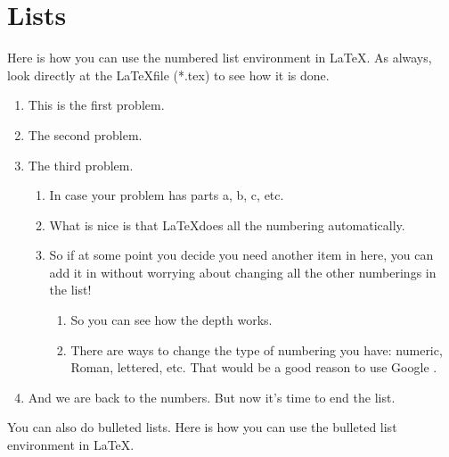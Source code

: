 \documentclass[12pt]{article}
\theoremstyle{definition}
\begin{document}
\section{Lists}
Here is how you can use the numbered list environment in \LaTeX.  As always, look directly at the \LaTeX \thinspace file (*.tex) to see how it is done.
\begin{enumerate} %

\item This is the first problem.
	
\item The second problem.
	
\item The third problem.
	
	\begin{enumerate}
		\item In case your problem has parts a, b, c, etc.
		
		\item What is nice is that \LaTeX \thinspace does all the numbering automatically.
		
		\item So if at some point you decide you need another item in here, you can add it in without worrying about changing all the other numberings in the list!
		\begin{enumerate}
			\item So you can see how the depth works.
			
			\item There are ways to change the type of numbering you have: numeric, Roman, lettered, etc. That would be a good reason to use Google \smiley. 
		\end{enumerate}
	\end{enumerate}
	
	\item And we are back to the numbers. But now it's time to end the list.

\end{enumerate}
You can also do bulleted lists. Here is how you can use the bulleted list environment in \LaTeX.
\end{document}
